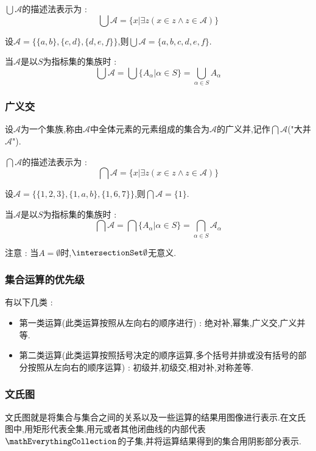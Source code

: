 {{{  $\bigcup \mathcal{A}$的描述法表示为 : $$
    \bigcup\mathcal{A} = \{x | \exists z (x \in z \land z \in \mathcal{A})\}
  $$

  设$\mathcal{A} = \{\{a,b\},\{c,d\},\{d,e,f\}\}$,则$\bigcup \mathcal{A} = \{a,b,c,d,e,f\}$.

  当$\mathcal{A}$是以$S$为指标集的集族时 : $$
    \bigcup\mathcal{A} = \bigcup\{A_\alpha | \alpha \in S\} = \bigcup_{\alpha \in S}A_\alpha
  $$
}%

\subsubsection{广义交}{
  设$\mathcal{A}$为一个集族,称由$\mathcal{A}$中全体元素的元素组成的集合为$\mathcal{A}$的广义并,记作$\bigcap \mathcal{A}$("大并$\mathcal{A}$").

  $\bigcap \mathcal{A}$的描述法表示为 : $$
    \bigcap\mathcal{A} = \{x | \exists z (x \in z \land z \in \mathcal{A})\}
  $$

  设$\mathcal{A} = \{\{1,2,3\},\{1,a,b\},\{1,6,7\}\}$,则$\bigcap \mathcal{A} = \{1\}$.

  当$\mathcal{A}$是以$S$为指标集的集族时 : $$
    \bigcap\mathcal{A} = \bigcap\{A_\alpha | \alpha \in S\} = \bigcap_{\alpha \in S}\mathcal{A}_\alpha
  $$

  注意 : 当$A = \emptyset$时,$\intersectionSet \emptyset$无意义.
}%

\subsubsection{集合运算的优先级}{
  有以下几类 :

  \begin{itemize}
    \item 第一类运算(此类运算按照从左向右的顺序进行) : 绝对补,幂集,广义交,广义并等.
    \item 第二类运算(此类运算按照括号决定的顺序运算,多个括号并排或没有括号的部分按照从左向右的顺序运算) : 初级并,初级交,相对补,对称差等.
  \end{itemize}
}%

\subsubsection{文氏图}{
  文氏图就是将集合与集合之间的关系以及一些运算的结果用图像进行表示.在文氏图中,用矩形代表全集,用元或者其他闭曲线的内部代表$\mathEverythingCollection$的子集,并将运算结果得到的集合用阴影部分表示.

}}}
